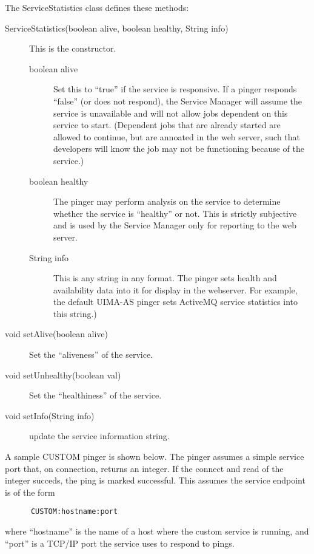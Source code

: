       The ServiceStatistics class defines these methods:
      \begin{description}
        \item[ServiceStatistics(boolean alive, boolean healthy, String info)] This is the constructor.
          \begin{description}
            \item[boolean alive] Set this to ``true'' if the service is responsive.  If a pinger responds
              ``false'' (or does not respond), the Service Manager will assume the service is unavailable
              and will not allow jobs dependent on this service to start.  (Dependent jobs that are already
              started are allowed to continue, but are annoated in the web server, such that developers
              will know the job may not be functioning because of the service.)
            \item[boolean healthy] The pinger may perform analysis on the service to determine whether
              the service is ``healthy'' or not.  This is strictly subjective and is used by the
              Service Manager only for reporting to the web server.
            \item[String info] This is any string in any format.  The pinger sets health and availability
              data into it for display in the webserver.  For example, the default UIMA-AS pinger sets
              ActiveMQ service statistics into this string.)
          \end{description}
          
          \item[void setAlive(boolean alive)] Set the ``aliveness'' of the service.

          \item[void setUnhealthy(boolean val)] Set the ``healthiness'' of the service.
            
          \item[void setInfo(String info)] update the service information string.
      \end{description}

      A sample CUSTOM pinger is shown below. The pinger assumes a simple
      service port that, on connection, returns an integer.  If the connect and read of the integer succeds,
      the ping is marked successful.   This assumes the service endpoint is of the form
\begin{verbatim}
      CUSTOM:hostname:port
\end{verbatim}
      where ``hostname'' is the name of a host where the custom service is running, and ``port'' is
      a TCP/IP port the service uses to respond to pings.
      
